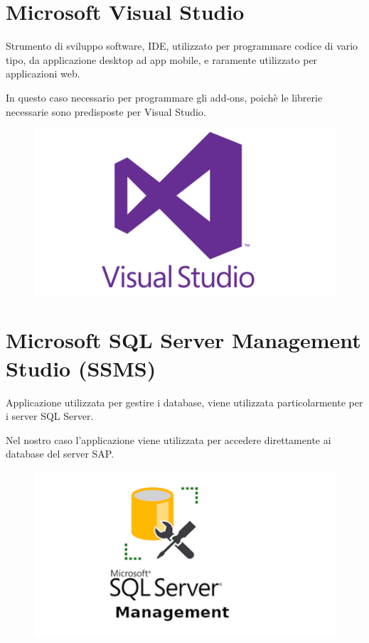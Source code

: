 \section{Microsoft Visual Studio}
\begin{flushleft}
	Strumento di sviluppo software, IDE, utilizzato per programmare codice di vario tipo, da applicazione desktop ad app mobile, e raramente utilizzato per applicazioni web.
	
	In questo caso necessario per programmare gli add-ons, poichè le librerie necessarie sono predisposte per Visual Studio.
\end{flushleft}
\begin{figure}[!h] 
	\centering
	\includegraphics[scale = 0.4]{immagini/tecnologie/visual-studio}
\end{figure}
\section{Microsoft SQL Server Management Studio (SSMS)}
\begin{flushleft}
	Applicazione utilizzata per gestire i database, viene utilizzata particolarmente per i server SQL Server.
	
	Nel nostro caso l'applicazione viene utilizzata per accedere direttamente ai database del server SAP.
	
\end{flushleft}
\begin{figure}[!h] 
	\centering
	\includegraphics[scale = 0.5]{immagini/tecnologie/microsoft ssms}
\end{figure}

